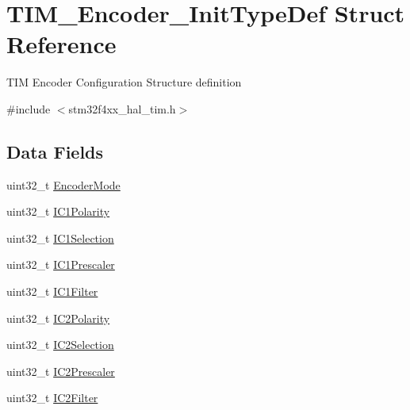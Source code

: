 \hypertarget{struct_t_i_m___encoder___init_type_def}{}\section{T\+I\+M\+\_\+\+Encoder\+\_\+\+Init\+Type\+Def Struct Reference}
\label{struct_t_i_m___encoder___init_type_def}


T\+IM Encoder Configuration Structure definition ~\newline
  




{\ttfamily \#include $<$stm32f4xx\+\_\+hal\+\_\+tim.\+h$>$}

\subsection*{Data Fields}
\begin{DoxyCompactItemize}
\item 
uint32\+\_\+t \mbox{\hyperlink{struct_t_i_m___encoder___init_type_def_ab451cb61e197d30ca8d3ce1c820ae1a4}{Encoder\+Mode}}
\item 
uint32\+\_\+t \mbox{\hyperlink{struct_t_i_m___encoder___init_type_def_ac1191c7421a3ca4c53ec7875870812e5}{I\+C1\+Polarity}}
\item 
uint32\+\_\+t \mbox{\hyperlink{struct_t_i_m___encoder___init_type_def_ae0c7ebe03057c1dd939555d1d924afd1}{I\+C1\+Selection}}
\item 
uint32\+\_\+t \mbox{\hyperlink{struct_t_i_m___encoder___init_type_def_aa913a8df0a4c97fefa87ff760fae10cb}{I\+C1\+Prescaler}}
\item 
uint32\+\_\+t \mbox{\hyperlink{struct_t_i_m___encoder___init_type_def_a5efa2ad5085fe72fb0b5dc2e2fc61def}{I\+C1\+Filter}}
\item 
uint32\+\_\+t \mbox{\hyperlink{struct_t_i_m___encoder___init_type_def_a67a8a854c58aedd9d37aa9f2ad4f49b4}{I\+C2\+Polarity}}
\item 
uint32\+\_\+t \mbox{\hyperlink{struct_t_i_m___encoder___init_type_def_af5b15660e7593a0fa62ee00059b3a9f4}{I\+C2\+Selection}}
\item 
uint32\+\_\+t \mbox{\hyperlink{struct_t_i_m___encoder___init_type_def_a0ce08ea64b9e8986336acf65fbfc1976}{I\+C2\+Prescaler}}
\item 
uint32\+\_\+t \mbox{\hyperlink{struct_t_i_m___encoder___init_type_def_ab64eaec6065c8729c961721901f6a8d7}{I\+C2\+Filter}}
\end{DoxyCompactItemize}



